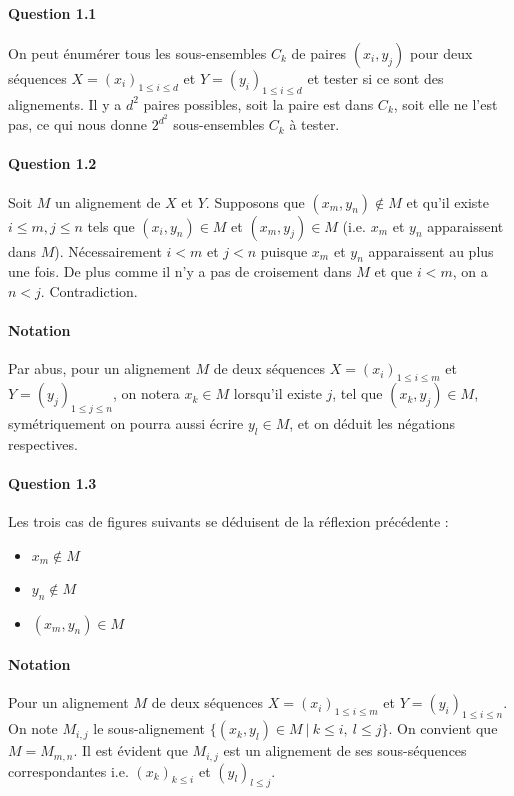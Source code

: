 \paragraph{Question 1.1}
On peut \'enum\'erer tous les sous-ensembles $C_k$ de paires
$(x_i,y_j)$ pour deux s\'equences $X=(x_i)_{1\leq i\leq d}$ et
$Y=(y_i)_{1\leq i\leq d}$ et tester si ce sont des alignements. Il y a
$d^2$ paires possibles, soit la paire est dans $C_k$, soit elle ne
l'est pas, ce qui nous donne $2^{d^2}$ sous-ensembles $C_k$ \`a tester.
\paragraph{Question 1.2}
Soit $M$ un alignement de $X$ et $Y$. Supposons que $(x_m,y_n)\not\in M$
et qu'il existe $i\leq m, j\leq n$ tels que $(x_i,y_n)\in M$ et
$(x_m,y_j)\in M$ (i.e. $x_m$ et $y_n$ apparaissent dans
$M$). N\'ecessairement $i<m$ et $j<n$ puisque $x_m$ et $y_n$
apparaissent au plus une fois. De plus comme il n'y a pas de
croisement dans $M$ et que $i<m$, on a $n<j$. Contradiction.
\paragraph{Notation}
Par abus, pour un alignement $M$ de deux s\'equences 
$X=(x_i)_{1\leq i\leq m}$ et $Y=(y_j)_{1\leq j\leq n}$,
on notera $x_k\in M$ lorsqu'il existe $j$, tel que $(x_k,y_j)\in M$,
sym\'etriquement on pourra aussi \'ecrire $y_l\in M$, et on d\'eduit les
n\'egations respectives.
\paragraph{Question 1.3}
Les trois cas de figures suivants se d\'eduisent de la r\'eflexion
pr\'ec\'edente :
\begin{itemize}
\item $x_m\not\in M$
\item $y_n\not\in M$
\item $(x_m,y_n)\in M$
\end{itemize}
\paragraph{Notation}
Pour un alignement $M$ de deux s\'equences $X=(x_i)_{1\leq i\leq m}$
et $Y=(y_i)_{1\leq i\leq n}$. On note $M_{i,j}$ le sous-alignement
$\Big\{(x_k,y_l)\in M\ |\ k\leq i,\ l\leq j\Big\}$. On convient que
$M=M_{m,n}$. Il est \'evident que $M_{i,j}$ est un alignement de ses
sous-s\'equences correspondantes i.e. $(x_k)_{k\leq i}$ et
$(y_l)_{l\leq j}$.

